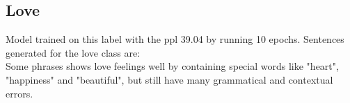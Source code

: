 \documentclass[a4paper]{article}
\begin{document}
\subsection{Love}
Model trained on this label with the ppl 39.04 by running 10 epochs. Sentences generated for the love class are:\\

Some phrases shows love feelings well by containing special words like "heart", "happiness" and "beautiful", but still have many grammatical and contextual errors.\\
\end{document}
